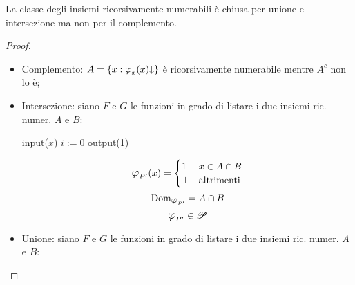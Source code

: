\begin{theorem}
    La classe degli insiemi ricorsivamente numerabili è chiusa per unione e intersezione
    ma non per il complemento.
\end{theorem}
\begin{proof}\phantom{x}
    \begin{itemize}
        \item Complemento: $A=\{x:\semRAM_x(x)\termina \}$ è ricorsivamente numerabile mentre
            $A^c$ non lo è;
        \item Intersezione: siano $F$ e $G$ le funzioni in grado di listare i due insiemi
            ric. numer. $A$ e $B$:

            \begin{minipage}{.29\textwidth}
                \begin{tcolorbox}[
                    colback=white,
                    sharp corners,
                    boxrule=.3mm,
                    left=20pt,
                    top=0pt,
                    bottom=0pt,
                    title=$P'$,
                    colbacktitle=white,
                    coltitle=black
                ]
                \begin{algorithm}[H]
                    input($x$)\;
                    $i:=0$\;
                    output(1)\;
                \end{algorithm}
                \end{tcolorbox}
            \end{minipage}
            \begin{minipage}{.4\textwidth}
                $$ \semRAM_{P'}(x) = \begin{cases}
                    1 & x\in A\cap B\\
                    \perp & \text{altrimenti}
                \end{cases} $$
                $$\text{Dom}_{\semRAM_{P'}} = A\cap B $$
                $$ \semRAM_{P'} \in \ricPar $$
            \end{minipage}\vspace{.6em}
        \item Unione: siano $F$ e $G$ le funzioni in grado di listare i due insiemi
            ric. numer. $A$ e $B$:
            

\end{itemize}
\end{proof}
